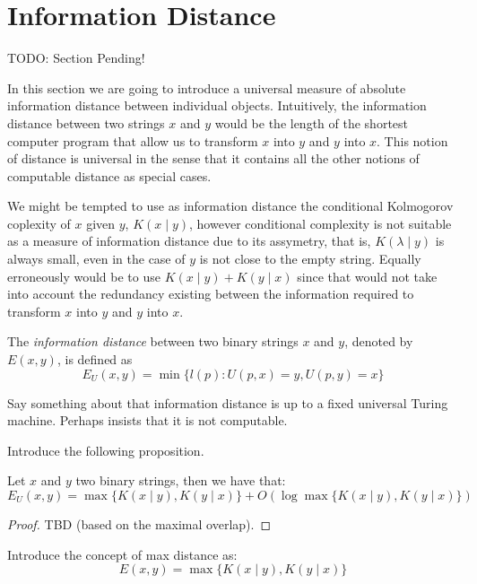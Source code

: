 %
%

\section{Information Distance}
\label{sec:information_distance}

{\color{red} TODO: Section Pending!}

In this section we are going to introduce a universal measure of absolute information distance between individual objects. Intuitively, the information distance between two strings $x$ and $y$ would be the length of the shortest computer program that allow us to transform $x$ into $y$ and $y$ into $x$. This notion of distance is universal in the sense that it contains all the other notions of computable distance as special cases.

We might be tempted to use as information distance the conditional Kolmogorov coplexity of $x$ given $y$, $K(x \mid y)$, however conditional complexity is not suitable as a measure of information distance due to its assymetry, that is, $K( \lambda \mid y)$ is always small, even in the case of $y$ is not close to the empty string. Equally erroneously would be to use $K(x \mid y) + K(y \mid x)$ since that would not take into account the redundancy existing between the information required to transform $x$ into $y$ and $y$ into $x$.

\begin{definition}
The \emph{information distance} between two binary strings $x$ and $y$, denoted by $E(x, y)$, is defined as
\[
E_U(x, y) = \min \{ l(p) : U(p, x) = y, U(p, y) = x \}
\]
\end{definition}

{\color{red} Say something about that information distance is up to a fixed universal Turing machine. Perhaps insists that it is not computable.}

{\color{red} Introduce the following proposition.}

\begin{proposition}
Let $x$ and $y$ two binary strings, then we have that:
\[
E_U(x, y) = \max\{ K(x \mid y), K(y \mid x) \} + O ( \log \max\{ K(x \mid y), K(y \mid x) \}) 
\]
\end{proposition}
\begin{proof}
{\color{red} TBD (based on the maximal overlap).}
\end{proof}

{\color{red} Introduce the concept of max distance as:}
\[
E(x, y) = \max\{ K(x \mid y), K(y \mid x) \}
\]

